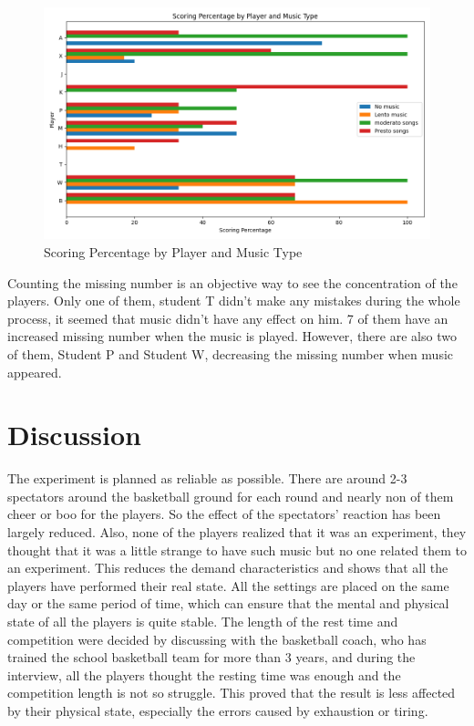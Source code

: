 \documentclass[man,floatsintext]{apa7}
\begin{document}
\begin{figure}[h]
\centering
\includegraphics[width=\textwidth]{out.png}
\caption{Scoring Percentage by Player and Music Type}
\label{scoreperc}
\end{figure}

Counting the missing number is an objective way to see the concentration of the players. Only one of them, student T didn't make any mistakes during the whole process, it seemed that music didn't have any effect on him. 7 of them have an increased missing number when the music is played. However, there are also two of them, Student P and Student W, decreasing the missing number when music appeared. 

\section{Discussion}

The experiment is planned as reliable as possible. There are around 2-3 spectators around the basketball ground for each round and nearly non of them cheer or boo for the players. So the effect of the spectators' reaction has been largely reduced. Also, none of the players realized that it was an experiment, they thought that it was a little strange to have such music but no one related them to an experiment. This reduces the demand characteristics and shows that all the players have performed their real state. All the settings are placed on the same day or the same period of time, which can ensure that the mental and physical state of all the players is quite stable. The length of the rest time and competition were decided by discussing with the basketball coach, who has trained the school basketball team for more than 3 years, and during the interview, all the players thought the resting time was enough and the competition length is not so struggle. This proved that the result is less affected by their physical state, especially the errors caused by exhaustion or tiring. 
\end{document}
